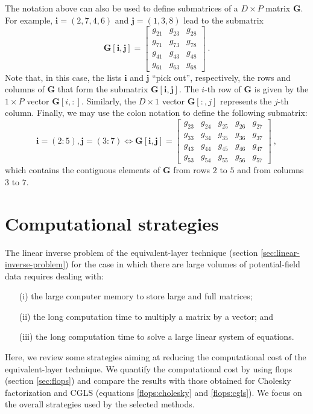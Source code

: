 The notation above can also be used to define submatrices of a $D \times P$ matrix $\mathbf{G}$. 
For example, $\mathbf{i} = (2, 7, 4, 6)$ and $\mathbf{j} = (1, 3, 8)$ lead to the submatrix
\begin{equation*}
	\mathbf{G}[\mathbf{i}, \mathbf{j}] = \begin{bmatrix}
		g_{21} & g_{23} & g_{28} \\
		g_{71} & g_{73} & g_{78} \\
		g_{41} & g_{43} & g_{48} \\
		g_{61} & g_{63} & g_{68} 
	\end{bmatrix} \: .
\end{equation*}
Note that, in this case, the lists $\mathbf{i}$ and $\mathbf{j}$ ``pick out'', respectively, the rows and columns
of $\mathbf{G}$ that form the submatrix $\mathbf{G}[\mathbf{i}, \mathbf{j}]$.
The $i$-th row of $\mathbf{G}$ is given by the $1 \times P$ vector $\mathbf{G}[i,:]$.
Similarly, the $D \times 1$ vector $\mathbf{G}[:,j]$ represents the $j$-th column.
Finally, we may use the colon notation to define the following submatrix:
\begin{equation*}
	\mathbf{i} = (2:5), \mathbf{j} = (3:7) \Leftrightarrow
	\mathbf{G}[\mathbf{i},\mathbf{j}] = \begin{bmatrix}
		g_{23} & g_{24} & g_{25} & g_{26} & g_{27} \\
		g_{33} & g_{34} & g_{35} & g_{36} & g_{37} \\
		g_{43} & g_{44} & g_{45} & g_{46} & g_{47} \\
		g_{53} & g_{54} & g_{55} & g_{56} & g_{57}
	\end{bmatrix} \: ,
\end{equation*}
which contains the contiguous elements of $\mathbf{G}$ from rows $2$ to $5$ and from columns
$3$ to $7$.

\section{Computational strategies}
\label{sec:computational-strategies}

The linear inverse problem of the equivalent-layer technique (section \ref{sec:linear-inverse-problem}) for the case
in which there are large volumes of potential-field data requires dealing with:
\begin{itemize}
	\item[(i)] the large computer memory to store large and full matrices;
	\item[(ii)] the long computation time to multiply a matrix by a vector; and
	\item[(iii)] the long computation time to solve a large linear system of equations.
\end{itemize}
Here, we review some strategies aiming at reducing the computational cost of the equivalent-layer technique. 
We quantify the computational cost by using flops (section \ref{sec:flops}) and compare the results with those obtained for Cholesky factorization and CGLS (equations \ref{flops:cholesky} and \ref{flops:cgls}). 
We focus on the overall strategies used by the selected methods.

